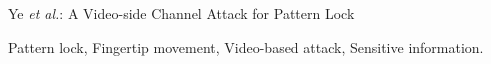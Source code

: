 \documentclass[journal,table,twoside]{IEEEtran}
\begin{document}
%
{Ye \MakeLowercase{\textit{et al.}}: A Video-side Channel Attack for Pattern Lock}

\maketitle



\begin{IEEEkeywords}
    Pattern lock, Fingertip movement, Video-based attack, Sensitive information.
\end{IEEEkeywords}












\IEEEpeerreviewmaketitle


\ifCLASSOPTIONcaptionsoff
  \newpage
\fi


\balance

\end{document}
